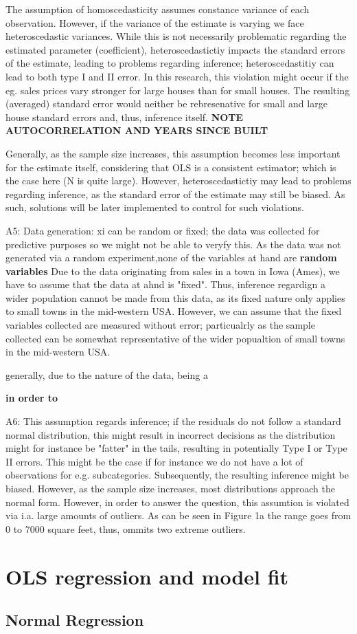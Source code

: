 \documentclass[a4paper]{article}
\begin{document}
The assumption of homoscedasticity assumes constance variance of each observation. However, if the variance of the estimate is varying we face heteroscedastic variances. While this is not necessarily problematic regarding the estimated parameter (coefficient), heteroscedastictiy impacts the standard errors of the estimate, leading to problems regarding inference; heteroscedastitiy can lead to both type I and II error. In this research, this violation might occur if the eg. sales prices vary stronger for large houses than for small houses. The resulting (averaged) standard error would neither be rebresenative for small and large house standard errors and, thus, inference itself.
\textbf{NOTE AUTOCORRELATION AND YEARS SINCE BUILT}

Generally, as the sample size increases, this assumption becomes less important for the estimate itself, considering that OLS is a consistent estimator; which is the case here (N is quite large). However, heteroscedastictiy may lead to problems regarding inference, as the standard error of the estimate may still be biased. As such, solutions will be later implemented to control for such violations.



A5: Data generation: xi can be random or fixed; the data was collected for predictive purposes so we might not be able to veryfy this. As the data was not generated via a random experiment,none of the variables at hand are \textbf{random variables}
Due to the data originating from sales in a town in Iowa (Ames), we have to assume that the data at ahnd is "fixed". Thus, inference regardign a wider population cannot be made from this data, as its fixed nature only applies to small towns in the mid-western USA. However, we can assume that the fixed variables collected are measured without error; particualrly as the sample collected can be somewhat representative of the wider popualtion of small towns in the mid-western USA. 


generally, due to the nature of the data, being a 

\textbf{in order to }

A6: This assumption regards inference; if the residuals do not follow a standard normal distribution, this might result in incorrect decisions as the distribution might for instance be "fatter" in the tails, resulting in potentially Type I or Type II errors. This might be the case if for instance we do not have a lot of observations for e.g. subcategories. Subsequently, the resulting inference might be biased. However, as the sample size increases, most distributions approach the normal form. 
However, in order to answer the question, this assumtion is violated via i.a. large amounts of outliers. As can be seen in Figure 1a the range goes from 0 to 7000 square feet, thus, ommits two extreme outliers.


\section{OLS regression and model fit}
\subsection{Normal Regression}
\end{document}
